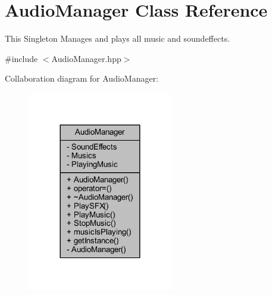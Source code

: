 \hypertarget{class_audio_manager}{\section{Audio\-Manager Class Reference}
\label{class_audio_manager}
}


This Singleton Manages and plays all music and soundeffects.  




{\ttfamily \#include $<$Audio\-Manager.\-hpp$>$}



Collaboration diagram for Audio\-Manager\-:\nopagebreak
\begin{figure}[H]
\begin{center}
\leavevmode
\includegraphics[width=180pt]{class_audio_manager__coll__graph}
\end{center}
\end{figure}
